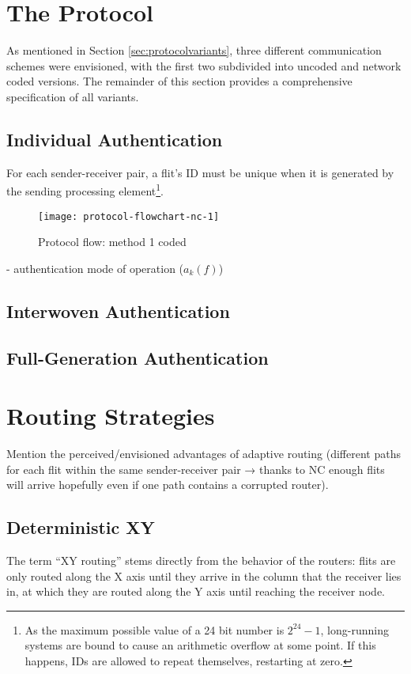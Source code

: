 \section{The Protocol}\label{sec:theprotocol}
As mentioned in Section \ref{sec:protocolvariants}, three different communication schemes were envisioned, with the first two subdivided into uncoded
and network coded versions. The remainder of this section provides a comprehensive specification of all variants.

\subsection{Individual Authentication}
For each sender-receiver pair, a
flit's ID must be unique when it is generated by the sending processing element\footnote{As the maximum possible value of a 24 bit number is
$2^{24}-1$, long-running systems are bound to cause an arithmetic overflow at some point. If this happens, IDs are allowed to repeat themselves,
restarting at zero.}. 
\begin{figure}
    \centering
    \texttt{[image: protocol-flowchart-nc-1]}
    \caption[Protocol flow: method 1 coded]{Protocol flow: method 1 coded}
    \label{fig:protchartnc1}
\end{figure}

- authentication mode of operation ($a_k(f)$)

\subsection{Interwoven Authentication}

\subsection{Full-Generation Authentication}

\section{Routing Strategies}
Mention the perceived/envisioned advantages of adaptive routing (different paths for each flit within the same sender-receiver pair → thanks
to NC enough flits will arrive hopefully even if one path contains a corrupted router).

\subsection{Deterministic XY}
The term \enquote{XY routing} stems directly from the behavior of the routers: flits are only routed along the X axis until they arrive in the column
that the receiver lies in, at which they are routed along the Y axis until reaching the receiver node.
